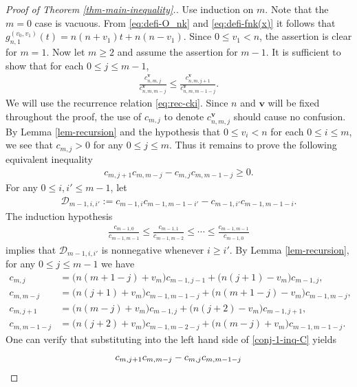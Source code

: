 \documentclass[10pt,a4paper]{amsart}
\begin{document}
\begin{proof}[Proof of Theorem \ref{thm-main-inequality}.]
Use induction on $m$. Note that the $m=0$ case is vacuous. 
From \eqref{eq:defi-O_nk} and \eqref{eq:defi-fnk(x)} it follows that 
$g^{{(v_0,v_1)}}_{n,1}(t)=n(n+v_1)t+n(n-v_1)$. Since $0\leq v_1<n$, 
the assertion is clear for $m=1$.
Now let $m\geq 2$ and assume the assertion for $m-1$.
It is sufficient to show that for each $0\leq j\leq m-1$,
\begin{align*}%
        \frac{c^{\mathbf{v}}_{n,m,j}}{c^{\mathbf{v}}_{n,m,m-j}}\le\frac{c^{\mathbf{v}}_{n,m,j+1}}{c^{\mathbf{v}}_{n,m,m-1-j}}.
    \end{align*} 
We will use the recurrence relation \eqref{eq:rec-cki}. Since $n$ and $\mathbf{v}$ will be fixed throughout the proof, the use of $c_{m,j}$ to denote $c^{\mathbf v}_{n,m,j}$ should cause no confusion. 
By Lemma \ref{lem-recursion} and the hypothesis that $0\leq v_i<n$ for each $0\leq i\leq m$,
we see that $c_{m,j}> 0$ for any $0 \le j \le m$.
Thus it remains to prove the following equivalent inequality
    \begin{align}\label{conj-1-inq-C}
      c_{m,j+1}c_{m,m-j}-  c_{m,j}c_{m,m-1-j}\ge 0.
    \end{align}
For any $0\leq i,i' \leq m-1$, let
\begin{align*}
\mathcal{D}_{m-1,i,i'}:=c_{m-1,i}c_{m-1,m-1-i'}-c_{m-1,i'}c_{m-1,m-1-i}.
 \end{align*}
The induction hypothesis
    \begin{align*}
        \frac{c_{m-1,0}}{c_{m-1,m-1}}\le\frac{c_{m-1,1}}{c_{m-1,m-2}}\le\cdots\le\frac{c_{m-1,m-1}}{c_{m-1,0}}
    \end{align*}
implies that $\mathcal{D}_{m-1,i,i'}$ is nonnegative whenever $i\geq i'$. 
By Lemma \ref{lem-recursion}, for any $0\leq j \leq m-1$ we have 
\begin{align*}
c_{m,j}&=\big(n(m+1-j)+v_m\big)c_{m-1,j-1}+\big(n(j+1)-v_m\big)c_{m-1,j},\\
c_{m,m-j}&=\big(n(j+1)+v_m\big)c_{m-1,m-1-j}+\big(n(m+1-j)-v_m\big)c_{m-1,m-j},\\
c_{m,j+1}&=\big(n(m-j)+v_m\big)c_{m-1,j}+\big(n(j+2)-v_m\big)c_{m-1,j+1},\\
c_{m,m-1-j}&=\big(n(j+2)+v_m\big)c_{m-1,m-2-j}+\big(n(m-j)+v_m\big)c_{m-1,m-1-j}.
\end{align*}
One can verify that substituting into 
the left hand side of \eqref{conj-1-inq-C} yields
\begin{align}
       c_{m,j+1}c_{m,m-j}&- c_{m,j}c_{m,m-1-j}\notag\\

\end{align}
\end{proof}
\end{document}
